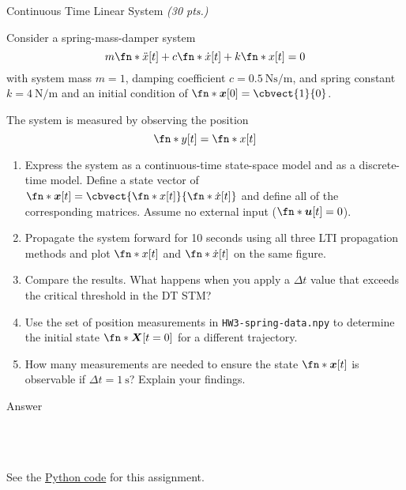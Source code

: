 \begin{hwkProblem}{2}{Continuous Time Linear System \textit{(30 pts.)}} \label{hwk:p02}

	Consider a spring-mass-damper system
	\[
		m \fn*{\ddot{x}}[t] + c \fn*{\dot{x}}[t] + k \fn*{x}[t] = 0
	\]
	with system mass \(m = 1\), damping coefficient \(c = \qty{0.5}{\N\s\per\m}\), and spring constant \(k = \qty{4}{\N\per\m}\) and an initial condition of \(\fn*{\boldsymbol{x}}[0] = \cbvect{1}{0}\).

	The system is measured by observing the position
	\[
		\fn*{y}[t] = \fn*{x}[t]
	\]
	\begin{enumerate}[label=(\alph*)]
		\item \label{hwk:p02a} Express the system as a continuous-time state-space model and as a discrete-time model. Define a state vector of \(\fn*{\boldsymbol{x}}[t] = \cbvect{\fn*{x}[t]}{\fn*{\dot{x}}[t]}\) and define all of the corresponding matrices. Assume no external input (\(\fn*{\boldsymbol{u}}[t] = 0\)).
		\item \label{hwk:p02b} Propagate the system forward for 10 seconds using all three LTI propagation methods and plot \(\fn*{x}[t]\) and \(\fn*{\dot{x}}[t]\) on the same figure.
		\item \label{hwk:p02c} Compare the results. What happens when you apply a \(\Delta t\) value that exceeds the critical threshold in the DT STM?
		\item \label{hwk:p02d} Use the set of position measurements in \texttt{HW3-spring-data.npy} to determine the initial state \(\fn*{\boldsymbol{X}}[t=0]\) for a different trajectory.
		\item \label{hwk:p02e} How many measurements are needed to ensure the state \(\fn*{\boldsymbol{x}}[t]\) is observable if \(\Delta t=\qty{1}{\s}\)? Explain your findings.
	\end{enumerate}

	\hwkSol{} \label{hwk:s02}

	\hwkPart{} \label{hwk:s02a}

	Answer

	\hwkPart{} \label{hwk:s02b}

	\inputminted{python}{./outputs/text/s02b.txt}

	\hwkPart{} \label{hwk:s02c}

	\inputminted{python}{./outputs/text/s02c.txt}

	\hwkPart{} \label{hwk:s02d}

	\inputminted{python}{./outputs/text/s02d.txt}

	\hwkPart{} \label{hwk:s02e}

	\inputminted{python}{./outputs/text/s02e.txt}

	\hwkCode{} \label{code:s02}

	See the \href{https://www.github.com/vaisriv/enae441-hw03/blob/main/src/hw03.py#L0}{Python code} for this assignment.

\end{hwkProblem}

